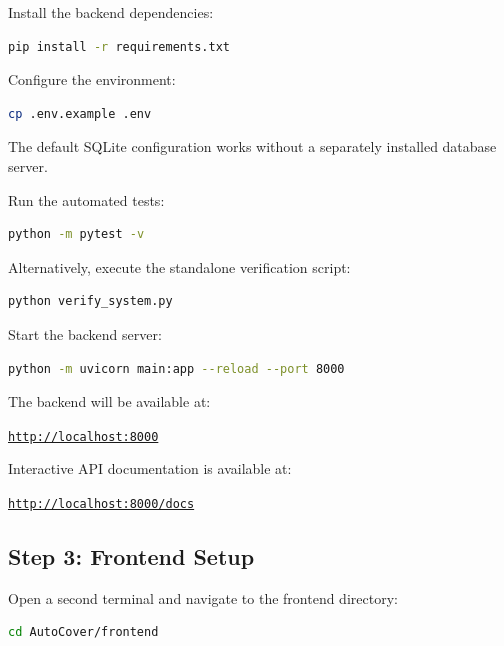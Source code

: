 \documentclass[11pt,a4paper]{article}
\begin{document}
Install the backend dependencies:

\begin{lstlisting}[language=bash]
pip install -r requirements.txt
\end{lstlisting}

Configure the environment:

\begin{lstlisting}[language=bash]
cp .env.example .env
\end{lstlisting}

The default SQLite configuration works without a separately
installed database server.

Run the automated tests:

\begin{lstlisting}[language=bash]
python -m pytest -v
\end{lstlisting}

Alternatively, execute the standalone verification script:

\begin{lstlisting}[language=bash]
python verify_system.py
\end{lstlisting}

Start the backend server:

\begin{lstlisting}[language=bash]
python -m uvicorn main:app --reload --port 8000
\end{lstlisting}

The backend will be available at:

\begin{center}
\href{http://localhost:8000}{\texttt{http://localhost:8000}}
\end{center}

Interactive API documentation is available at:

\begin{center}
\href{http://localhost:8000/docs}{\texttt{http://localhost:8000/docs}}
\end{center}

\subsection{Step 3: Frontend Setup}

Open a second terminal and navigate to the frontend directory:

\begin{lstlisting}[language=bash]
cd AutoCover/frontend
\end{lstlisting}
\end{document}
